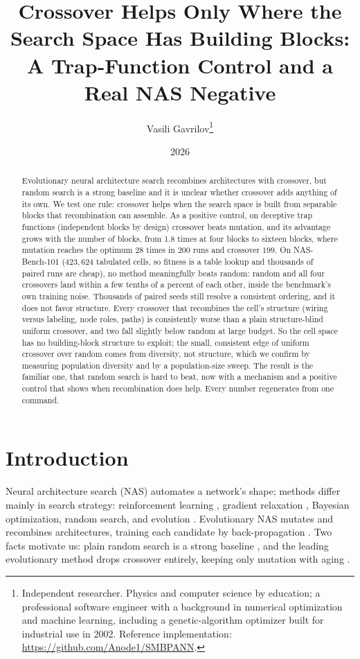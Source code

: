 \documentclass[11pt]{article}
\title{\textbf{Crossover Helps Only Where the Search Space Has Building Blocks:\\
A Trap-Function Control and a Real NAS Negative}}
\author{Vasili Gavrilov\thanks{Independent researcher. Physics and computer
science by education; a professional software engineer with a background in
numerical optimization and machine learning, including a genetic-algorithm
optimizer built for industrial use in 2002. Reference implementation:
\url{https://github.com/Anode1/SMBPANN}.}}
\date{2026}
\begin{document}
\maketitle

\begin{abstract}
Evolutionary neural architecture search recombines architectures with crossover, but random
search is a strong baseline and it is unclear whether crossover adds anything of its own. We
test one rule: crossover helps when the search space is built from separable blocks that
recombination can assemble. As a positive control, on deceptive trap functions (independent
blocks by design) crossover beats mutation, and its advantage grows with the number of blocks,
from 1.8 times at four blocks to sixteen blocks, where mutation reaches the optimum $28$ times
in $200$ runs and crossover $199$. On NAS-Bench-101 ($423{,}624$ tabulated cells, so fitness is
a table lookup and thousands of paired runs are cheap), no method meaningfully beats random:
random and all four crossovers land within a few tenths of a percent of each other, inside the
benchmark's own training noise. Thousands of paired seeds still resolve a consistent ordering,
and it does not favor structure. Every crossover that recombines the cell's structure (wiring
versus labeling, node roles, paths) is consistently worse than a plain structure-blind uniform
crossover, and two fall slightly below random at large budget. So the cell space has no
building-block structure to exploit; the small, consistent edge of uniform crossover over
random comes from diversity, not structure, which we confirm by measuring population diversity
and by a population-size sweep. The result is the familiar one, that random search is hard to
beat, now with a mechanism and a positive control that shows when recombination does help.
Every number regenerates from one command.
\end{abstract}

\section{Introduction}

Neural architecture search (NAS) automates a network's shape; methods differ mainly in search
strategy: reinforcement learning \cite{zoph2017}, gradient relaxation \cite{darts2019},
Bayesian optimization, random search, and evolution \cite{elsken2019}. Evolutionary NAS mutates
and recombines architectures, training each candidate by back-propagation \cite{real2019}. Two
facts motivate us: plain random search is a strong baseline \cite{bergstra2012,li2019}, and the
leading evolutionary method drops crossover entirely, keeping only mutation with aging
\cite{real2019}.
\end{document}
